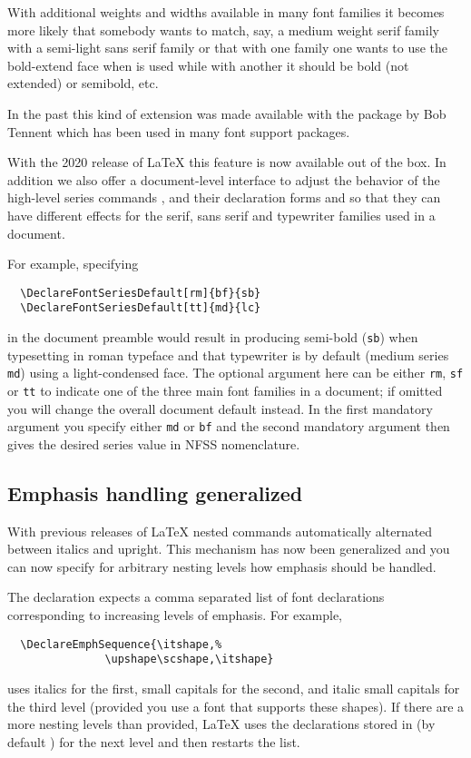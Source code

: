 \documentclass{ltnews}
\begin{document}
With additional weights and widths available in many font families it
becomes more likely that somebody wants to match, say, a medium weight
serif family with a semi-light sans serif family or that with one
family one wants to use the bold-extend face when  is used
while with another it should be bold (not extended) or semibold, etc.

In the past this kind of extension was made available with the
 package by Bob Tennent which has been used in many font
support packages.

With the 2020 release of \LaTeX{} this feature is now available out
of the box.  In addition we also offer a document-level interface to adjust the
behavior of the high-level series commands ,  and their
declaration forms  and  so that they can
have different effects for the serif, sans serif and typewriter
families used in a document.

For example, specifying
\begin{verbatim}
  \DeclareFontSeriesDefault[rm]{bf}{sb}
  \DeclareFontSeriesDefault[tt]{md}{lc}
\end{verbatim}
in the document preamble would result in  producing
semi-bold (\texttt{sb}) when typesetting in roman typeface and
that typewriter is by default (medium series \texttt{md}) using
a light-condensed face. The optional argument here can be either
\texttt{rm}, \texttt{sf} or \texttt{tt} to indicate one of the three
main font families in a document; if omitted you will change the
overall document default instead.  In the first mandatory argument you
specify either \texttt{md} or \texttt{bf} and the second mandatory
argument then gives the desired series value in NFSS nomenclature.


\subsection{Emphasis handling generalized}

With previous releases of \LaTeX{} nested  commands
automatically alternated between italics and upright.  This mechanism
has now been generalized and you can now specify for arbitrary nesting
levels how emphasis should be handled.

The declaration  expects a comma separated
list of font declarations corresponding to increasing levels of
emphasis. For example,
\begin{verbatim}
  \DeclareEmphSequence{\itshape,%
               \upshape\scshape,\itshape}
\end{verbatim}
uses italics for the first, small capitals for the second, and italic
small capitals for the third level (provided you use a font that
supports these shapes).  If there are a more nesting levels than
provided, \LaTeX{} uses the declarations stored in  (by
default ) for the next level and then
restarts the list.
\end{document}
